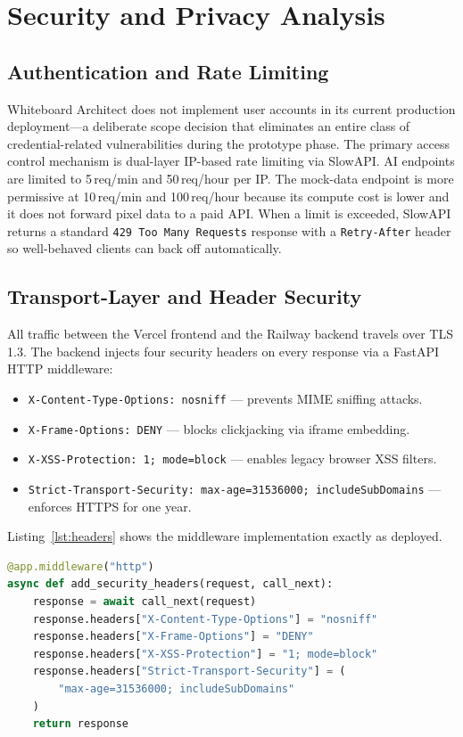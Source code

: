 \documentclass[conference]{IEEEtran}
\begin{document}
\section{Security and Privacy Analysis}

\subsection{Authentication and Rate Limiting}

Whiteboard Architect does not implement user accounts in its current
production deployment---a deliberate scope decision that eliminates
an entire class of credential-related vulnerabilities during the
prototype phase. The primary access control mechanism is dual-layer
IP-based rate limiting via SlowAPI. AI endpoints are limited to
5\,req/min and 50\,req/hour per IP. The mock-data endpoint is
more permissive at 10\,req/min and 100\,req/hour because its compute
cost is lower and it does not forward pixel data to a paid API.
When a limit is exceeded, SlowAPI returns a standard
\texttt{429 Too Many Requests} response with a \texttt{Retry-After}
header so well-behaved clients can back off automatically.

\subsection{Transport-Layer and Header Security}

All traffic between the Vercel frontend and the Railway backend
travels over TLS 1.3. The backend injects four security headers on
every response via a FastAPI HTTP middleware:

\begin{itemize}
  \item \texttt{X-Content-Type-Options: nosniff} --- prevents MIME
    sniffing attacks.
  \item \texttt{X-Frame-Options: DENY} --- blocks clickjacking via
    iframe embedding.
  \item \texttt{X-XSS-Protection: 1; mode=block} --- enables legacy
    browser XSS filters.
  \item \texttt{Strict-Transport-Security: max-age=31536000;
    includeSubDomains} --- enforces HTTPS for one year.
\end{itemize}

Listing~\ref{lst:headers} shows the middleware implementation
exactly as deployed.

\begin{lstlisting}[language=Python,
  caption={OWASP security header middleware in FastAPI.},
  label={lst:headers}]
@app.middleware("http")
async def add_security_headers(request, call_next):
    response = await call_next(request)
    response.headers["X-Content-Type-Options"] = "nosniff"
    response.headers["X-Frame-Options"] = "DENY"
    response.headers["X-XSS-Protection"] = "1; mode=block"
    response.headers["Strict-Transport-Security"] = (
        "max-age=31536000; includeSubDomains"
    )
    return response
\end{lstlisting}
\end{document}

